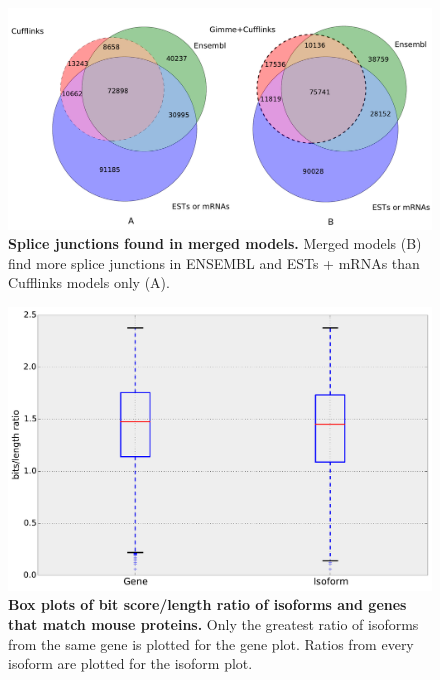 \documentclass[10pt]{article}
\begin{document}
\begin{figure}[!ht]
\begin{center}
\includegraphics[width=5in]{cuff_gimme_junctions_venn.pdf}
\end{center}
\caption{
    {\bf Splice junctions found in merged models.} Merged models (B) find more
    splice junctions in ENSEMBL and ESTs + mRNAs than Cufflinks models only (A).
}
\label{combined_venn}
\end{figure}


\begin{figure}[!ht]
\begin{center}
\includegraphics[width=5in]{mouse-homolog-boxplot.pdf}
\end{center}
\caption{
{\bf Box plots of bit score/length ratio of isoforms and genes that match mouse
proteins.} Only the greatest ratio of isoforms from the same gene is plotted for
the gene plot. Ratios from every isoform are plotted for the isoform plot.}
\label{bitscore}
\end{figure}
\end{document}
